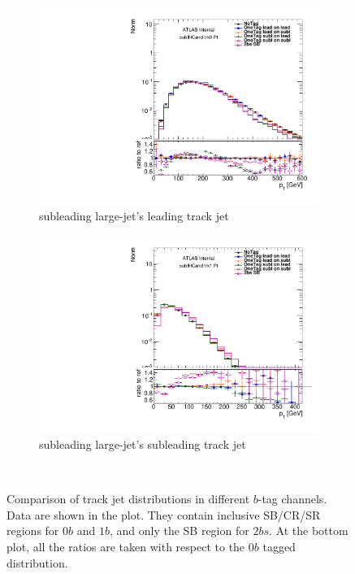 \begin{figure}[htb!]
    \begin{subfigure}[b]{0.4\textwidth}
        \includegraphics[width=\textwidth,angle=-90]{figures/boosted/Prereweight/2bs_directcompare_sublHCand_trk0_Pt_1.pdf}
        \caption{subleading large-\R jet's leading track jet \pt}
        \label{fig:rw-2bs-comp-subl0}
    \end{subfigure}
    \quad \quad 
    \begin{subfigure}[b]{0.4\textwidth}
        \includegraphics[width=\textwidth,angle=-90]{figures/boosted/Prereweight/2bs_directcompare_sublHCand_trk1_Pt_1.pdf}
        \caption{subleading large-\R jet's subleading track jet \pt}
        \label{fig:rw-2bs-comp-subl1}
    \end{subfigure} \\ 
   \caption{
   Comparison of track jet \pt distributions in different $b$-tag channels. Data are shown in the plot. They contain inclusive SB/CR/SR regions for 0$b$ and $1b$, and only the SB region for $2bs$. At the bottom plot, all the ratios are taken with respect to the 0$b$ tagged distribution.}
  \label{fig:rw-2bs-comp}
\end{figure}


